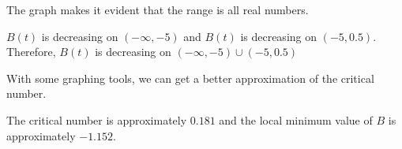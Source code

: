 \documentclass{ximera}
\begin{document}
\begin{example}
\begin{explanation}
The graph makes it evident that the range is all real numbers.






\begin{question}

$B(t)$ is decreasing on $(-\infty, -5)$ and $B(t)$ is decreasing on $(-5, 0.5)$.  Therefore, $B(t)$ is decreasing on $(-\infty, -5) \cup (-5, 0.5)$


\begin{multipleChoice}
\end{multipleChoice}
\end{question}

\end{explanation}

\end{example}








With some graphing tools, we can get a better approximation of the critical number.




\begin{center}
\end{center}



The critical number is approximately $0.181$ and the local minimum value of $B$ is approximately $-1.152$.
\end{document}
